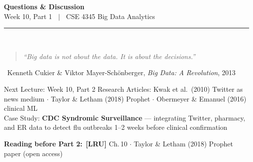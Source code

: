 \documentclass[aspectratio=169,10pt]{beamer}
\begin{document}
\begin{frame}[c]
  \begin{center}
    {\Large\bfseries Questions \& Discussion}\\[10pt]
    {\large Week 10, Part 1 $\;\mid\;$ CSE 4345 Big Data Analytics}\\[8pt]
    \textcolor{PUGray}{\rule{7cm}{0.5pt}}\\[10pt]
    \begin{quote}
      \itshape ``Big data is not about the data.  It is about the decisions.''
    \end{quote}
    \hfill\textemdash\ Kenneth Cukier \& Viktor Mayer-Sch\"{o}nberger, \textit{Big Data: A Revolution}, 2013
    \vspace{12pt}
    \begin{block}{\centering Next Lecture: Week 10, Part 2}
      \centering
      Research Articles: Kwak et al.\ (2010) Twitter as news medium $\cdot$ Taylor \& Letham (2018) Prophet $\cdot$ Obermeyer \& Emanuel (2016) clinical ML\\[4pt]
      \small Case Study: \textbf{CDC Syndromic Surveillance} ---
      integrating Twitter, pharmacy, and ER data to detect flu outbreaks 1--2 weeks before clinical confirmation
    \end{block}
    \vspace{6pt}
    \textbf{Reading before Part 2:}\ \textbf{[LRU]} Ch.\,10 $\cdot$ Taylor \& Letham (2018) Prophet paper (open access)
  \end{center}
\end{frame}

\end{document}
